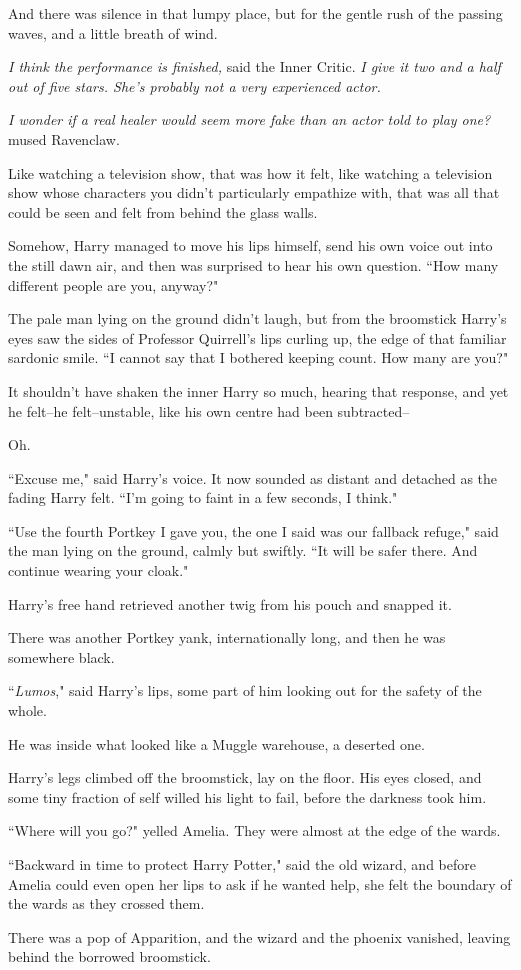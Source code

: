 And there was silence in that lumpy place, but for the gentle rush of the passing waves, and a little breath of wind.

\emph{I think the performance is finished,} said the Inner Critic. \emph{I give it two and a half out of five stars. She's probably not a very experienced actor.}

\emph{I wonder if a real healer would seem more fake than an actor told to play one?} mused Ravenclaw.

Like watching a television show, that was how it felt, like watching a television show whose characters you didn't particularly empathize with, that was all that could be seen and felt from behind the glass walls.

Somehow, Harry managed to move his lips himself, send his own voice out into the still dawn air, and then was surprised to hear his own question. ``How many different people are you, anyway?"

The pale man lying on the ground didn't laugh, but from the broomstick Harry's eyes saw the sides of Professor Quirrell's lips curling up, the edge of that familiar sardonic smile. ``I cannot say that I bothered keeping count. How many are you?"

It shouldn't have shaken the inner Harry so much, hearing that response, and yet he felt\---he felt\---unstable, like his own centre had been subtracted\---

Oh.

``Excuse me," said Harry's voice. It now sounded as distant and detached as the fading Harry felt. ``I'm going to faint in a few seconds, I think."

``Use the fourth Portkey I gave you, the one I said was our fallback refuge," said the man lying on the ground, calmly but swiftly. ``It will be safer there. And continue wearing your cloak."

Harry's free hand retrieved another twig from his pouch and snapped it.

There was another Portkey yank, internationally long, and then he was somewhere black.

``\emph{Lumos}," said Harry's lips, some part of him looking out for the safety of the whole.

He was inside what looked like a Muggle warehouse, a deserted one.

Harry's legs climbed off the broomstick, lay on the floor. His eyes closed, and some tiny fraction of self willed his light to fail, before the darkness took him.

\later

``Where will you go?" yelled Amelia. They were almost at the edge of the wards.

``Backward in time to protect Harry Potter," said the old wizard, and before Amelia could even open her lips to ask if he wanted help, she felt the boundary of the wards as they crossed them.

There was a pop of Apparition, and the wizard and the phoenix vanished, leaving behind the borrowed broomstick.

